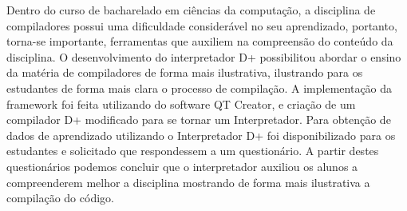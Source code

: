 \documentclass[12pt,oneside,a4paper,chapter=TITLE,section=TITLE,sumario=tradicional]{abntex2}
\begin{document}

\imprimircapa
\imprimirfolhaderosto


\begin{resumo}
	Dentro do curso de bacharelado em ciências da computação, a disciplina de compiladores possui uma dificuldade considerável no seu aprendizado, portanto, torna-se importante, ferramentas que auxiliem na compreensão do conteúdo da disciplina. O desenvolvimento do interpretador D+ possibilitou abordar o ensino da matéria de compiladores de forma mais ilustrativa, ilustrando para os estudantes de forma mais clara o processo de compilação. A implementação da framework foi feita utilizando do software QT Creator, e criação de um compilador D+ modificado para se tornar um Interpretador. Para obtenção de dados de aprendizado utilizando o Interpretador D+ foi disponibilizado para os estudantes e solicitado que respondessem a um questionário. A partir destes questionários podemos concluir que o interpretador auxiliou os alunos a compreenderem melhor a disciplina  mostrando de forma mais ilustrativa a compilação do código.
    
\end{resumo}

\listadefiguras
\end{document}

